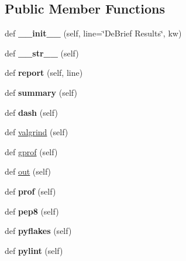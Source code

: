 \subsection*{Public Member Functions}
\begin{DoxyCompactItemize}
\item 
\hypertarget{classc_1_1_de_brief_1_1_de_brief_ae8e09d2674bdfc4190330a3099311973}{}def {\bfseries \+\_\+\+\_\+init\+\_\+\+\_\+} (self, line=\char`\"{}De\+Brief Results\char`\"{}, kw)\label{classc_1_1_de_brief_1_1_de_brief_ae8e09d2674bdfc4190330a3099311973}

\item 
\hypertarget{classc_1_1_de_brief_1_1_de_brief_ab0a283d7aed66574ee320844ca2e1cfa}{}def {\bfseries \+\_\+\+\_\+str\+\_\+\+\_\+} (self)\label{classc_1_1_de_brief_1_1_de_brief_ab0a283d7aed66574ee320844ca2e1cfa}

\item 
\hypertarget{classc_1_1_de_brief_1_1_de_brief_acc4c0719d3ddf7060afaf84667c702c4}{}def {\bfseries report} (self, line)\label{classc_1_1_de_brief_1_1_de_brief_acc4c0719d3ddf7060afaf84667c702c4}

\item 
\hypertarget{classc_1_1_de_brief_1_1_de_brief_a9fc39f8add3a4233a20ab9246e385354}{}def {\bfseries summary} (self)\label{classc_1_1_de_brief_1_1_de_brief_a9fc39f8add3a4233a20ab9246e385354}

\item 
\hypertarget{classc_1_1_de_brief_1_1_de_brief_a5dc5bbc6ab177f82fc5d682b672e5843}{}def {\bfseries dash} (self)\label{classc_1_1_de_brief_1_1_de_brief_a5dc5bbc6ab177f82fc5d682b672e5843}

\item 
def \hyperlink{classc_1_1_de_brief_1_1_de_brief_abf83d6ffb3bf219616c38856125f3021}{valgrind} (self)
\item 
def \hyperlink{classc_1_1_de_brief_1_1_de_brief_ad9801d00573a7d1726ebc54fcae3ce4c}{gprof} (self)
\item 
def \hyperlink{classc_1_1_de_brief_1_1_de_brief_a8cbc2aa08d0616d4b8fca29805fc6b28}{out} (self)
\item 
\hypertarget{classc_1_1_de_brief_1_1_de_brief_a07de6bf577f6f645e82574c6a05caa17}{}def {\bfseries prof} (self)\label{classc_1_1_de_brief_1_1_de_brief_a07de6bf577f6f645e82574c6a05caa17}

\item 
\hypertarget{classc_1_1_de_brief_1_1_de_brief_a341c082bd67861e3d17a05498fde1fbe}{}def {\bfseries pep8} (self)\label{classc_1_1_de_brief_1_1_de_brief_a341c082bd67861e3d17a05498fde1fbe}

\item 
\hypertarget{classc_1_1_de_brief_1_1_de_brief_a10cee21d0692e9248faba3c25b40dd37}{}def {\bfseries pyflakes} (self)\label{classc_1_1_de_brief_1_1_de_brief_a10cee21d0692e9248faba3c25b40dd37}

\item 
\hypertarget{classc_1_1_de_brief_1_1_de_brief_a26ca9d15bd50a681a4c3f48f28cec725}{}def {\bfseries pylint} (self)\label{classc_1_1_de_brief_1_1_de_brief_a26ca9d15bd50a681a4c3f48f28cec725}

\end{DoxyCompactItemize}
